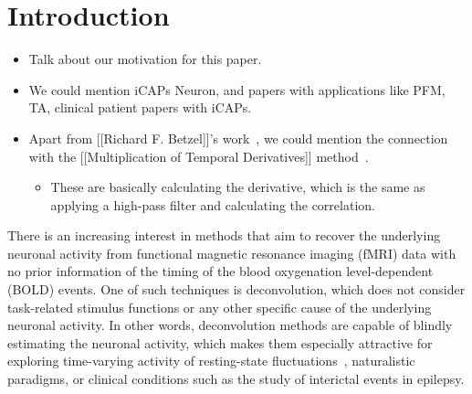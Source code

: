 \section{Introduction}

\begin{itemize}

    \item Talk about our motivation for this paper.

    \item We could mention iCAPs Neuron, and papers with applications like PFM, TA, clinical patient papers with iCAPs.

    \item Apart from [[Richard F. Betzel]]'s work~\cite{betzel2020temporal,esfahlani2020high,faskowitz2020edge}, we could mention the connection with the
    [[Multiplication of Temporal Derivatives]] method~\cite{shine2015estimation,shine2016dynamics}.

    \begin{itemize}
        \item These are basically calculating the derivative, which is the same as applying a high-pass filter and calculating the correlation.
    \end{itemize}

\end{itemize}

There is an increasing interest in methods that aim to recover the underlying neuronal activity from functional magnetic resonance imaging (fMRI) data with no prior information of the timing of the blood oxygenation level-dependent (BOLD) events. One of such techniques is deconvolution, which does not consider task-related stimulus functions or any other specific cause of the underlying neuronal activity. In other words, deconvolution methods are capable of blindly estimating the neuronal activity, which makes them especially attractive for exploring time-varying activity of resting-state fluctuations~\cite{petridou2013periods,karahanouglu2015transient,karahanouglu2017dynamics,kinany2020dynamic}, naturalistic paradigms, or clinical conditions such as the study of interictal events in epilepsy. 